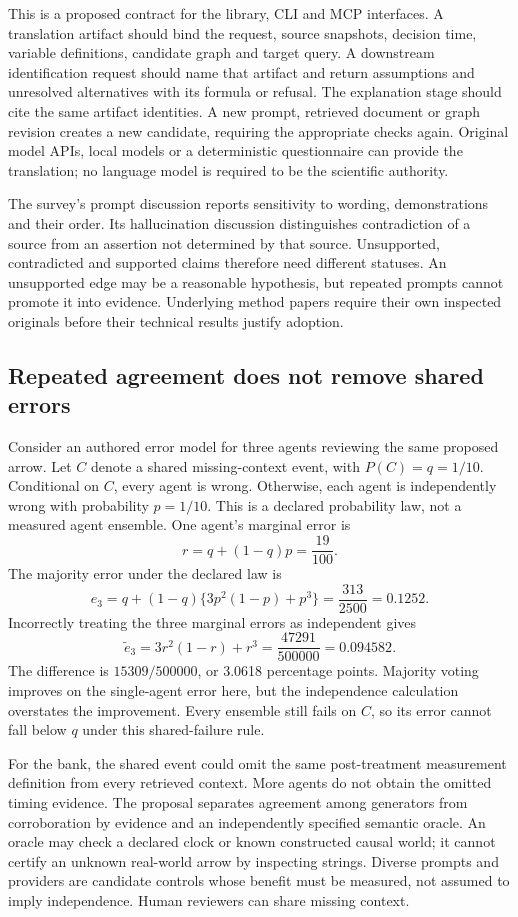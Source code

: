 This is a proposed contract for the library, CLI and MCP interfaces. A translation
artifact should bind the request, source snapshots, decision time, variable
definitions, candidate graph and target query. A downstream identification request
should name that artifact and return assumptions and unresolved alternatives
with its formula or refusal. The explanation stage should cite the same artifact
identities. A new prompt, retrieved document or graph revision creates a new
candidate, requiring the appropriate checks again. Original model APIs, local
models or a deterministic questionnaire can provide the translation; no language
model is required to be the scientific authority.

The survey's prompt discussion reports sensitivity to wording, demonstrations
and their order. Its hallucination discussion distinguishes contradiction of a
source from an assertion not determined by that source. Unsupported, contradicted
and supported claims therefore need different statuses. An unsupported edge may
be a reasonable hypothesis, but repeated prompts cannot promote it into evidence.
Underlying method papers require their own inspected originals before their
technical results justify adoption.\citep{exec24_llmchallenges_original}

\subsection{Repeated agreement does not remove shared errors}

Consider an authored error model for three agents reviewing the same proposed
arrow. Let $C$ denote a shared missing-context event, with $P(C)=q=1/10$.
Conditional on $C$, every agent is wrong. Otherwise, each agent is independently
wrong with probability $p=1/10$. This is a declared probability law, not a
measured agent ensemble. One agent's marginal error is
\[
 r=q+(1-q)p=\frac{19}{100}.
\]
The majority error under the declared law is
\[
 e_3=q+(1-q)\{3p^2(1-p)+p^3\}
     =\frac{313}{2500}=0.1252.
\]
Incorrectly treating the three marginal errors as independent gives
\[
 \widetilde e_3=3r^2(1-r)+r^3
     =\frac{47291}{500000}=0.094582.
\]
The difference is $15309/500000$, or 3.0618 percentage points. Majority voting
improves on the single-agent error here, but the independence calculation
overstates the improvement. Every ensemble still fails on $C$, so its error
cannot fall below $q$ under this shared-failure rule.
\citep{exec24_llmchallenges_reference}

For the bank, the shared event could omit the same post-treatment measurement
definition from every retrieved context. More agents do not obtain the omitted
timing evidence. The proposal separates agreement among generators from
corroboration by evidence and an independently specified semantic oracle.
An oracle may check a declared clock or known constructed causal world; it
cannot certify an unknown real-world arrow by inspecting strings. Diverse
prompts and providers are candidate controls whose benefit must be measured,
not assumed to imply independence. Human reviewers can share missing context.

